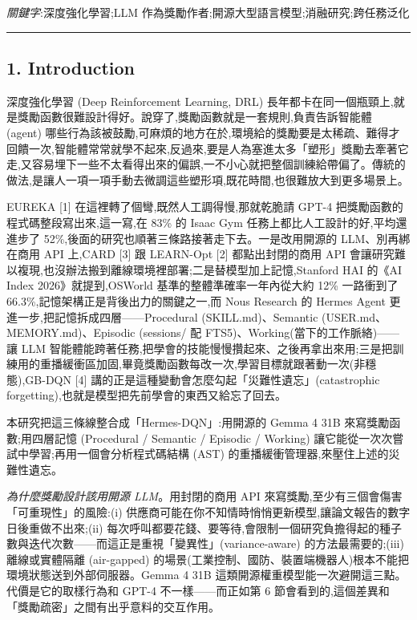 \emph{關鍵字}:深度強化學習;LLM 作為獎勵作者;開源大型語言模型;消融研究;跨任務泛化

\begin{center}\rule{0.5\linewidth}{0.5pt}\end{center}

\subsection{1. Introduction}\label{1-introduction}

深度強化學習 (Deep Reinforcement Learning, DRL) 長年都卡在同一個瓶頸上,就是獎勵函數很難設計得好。說穿了,獎勵函數就是一套規則,負責告訴智能體 (agent) 哪些行為該被鼓勵,可麻煩的地方在於,環境給的獎勵要是太稀疏、難得才回饋一次,智能體常常就學不起來,反過來,要是人為塞進太多「塑形」獎勵去牽著它走,又容易埋下一些不太看得出來的偏誤,一不小心就把整個訓練給帶偏了。傳統的做法,是讓人一項一項手動去微調這些塑形項,既花時間,也很難放大到更多場景上。

EUREKA {[}1{]} 在這裡轉了個彎,既然人工調得慢,那就乾脆請 GPT-4 把獎勵函數的程式碼整段寫出來,這一寫,在 83\% 的 Isaac Gym 任務上都比人工設計的好,平均還進步了 52\%,後面的研究也順著三條路接著走下去。一是改用開源的 LLM、別再綁在商用 API 上,CARD {[}3{]} 跟 LEARN-Opt {[}2{]} 都點出封閉的商用 API 會讓研究難以複現,也沒辦法搬到離線環境裡部署;二是替模型加上記憶,Stanford HAI 的《AI Index 2026》就提到,OSWorld 基準的整體準確率一年內從大約 12\% 一路衝到了 66.3\%,記憶架構正是背後出力的關鍵之一,而 Nous Research 的 Hermes Agent 更進一步,把記憶拆成四層------Procedural (SKILL.md)、Semantic (USER.md、MEMORY.md)、Episodic (sessions/ 配 FTS5)、Working(當下的工作脈絡)------讓 LLM 智能體能跨著任務,把學會的技能慢慢攢起來、之後再拿出來用;三是把訓練用的重播緩衝區加固,畢竟獎勵函數每改一次,學習目標就跟著動一次(非穩態),GB-DQN {[}4{]} 講的正是這種變動會怎麼勾起「災難性遺忘」(catastrophic forgetting),也就是模型把先前學會的東西又給忘了回去。

本研究把這三條線整合成「Hermes-DQN」:用開源的 Gemma 4 31B 來寫獎勵函數;用四層記憶 (Procedural / Semantic / Episodic / Working) 讓它能從一次次嘗試中學習;再用一個會分析程式碼結構 (AST) 的重播緩衝管理器,來壓住上述的災難性遺忘。

\emph{為什麼獎勵設計該用開源 LLM}。用封閉的商用 API 來寫獎勵,至少有三個會傷害「可重現性」的風險:(i) 供應商可能在你不知情時悄悄更新模型,讓論文報告的數字日後重做不出來;(ii) 每次呼叫都要花錢、要等待,會限制一個研究負擔得起的種子數與迭代次數------而這正是重視「變異性」(variance-aware) 的方法最需要的;(iii) 離線或實體隔離 (air-gapped) 的場景(工業控制、國防、裝置端機器人)根本不能把環境狀態送到外部伺服器。Gemma 4 31B 這類開源權重模型能一次避開這三點。代價是它的取樣行為和 GPT-4 不一樣------而正如第 6 節會看到的,這個差異和「獎勵疏密」之間有出乎意料的交互作用。

